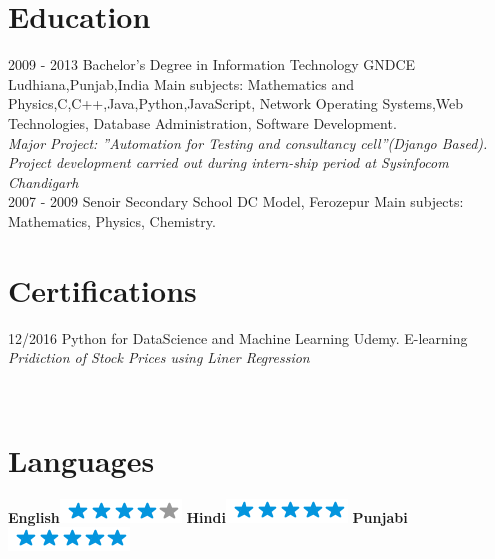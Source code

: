 \documentclass[]{friggeri-cv}
\begin{document}
\section{Education}
\begin{entrylist}
  \entry
    {2009 - 2013}
    {Bachelor's Degree in Information Technology}
    {GNDCE Ludhiana,Punjab,India}
    {Main subjects: Mathematics and Physics,C,C++,Java,Python,JavaScript, Network Operating Systems,Web Technologies, Database Administration, Software Development.\\
    \emph{Major Project: ”Automation for Testing and consultancy cell”(Django Based). Project development carried out during intern-ship period at Sysinfocom Chandigarh}\\}
  \entry
    {2007 - 2009}
    {Senoir Secondary School}
    {DC Model, Ferozepur}
    {Main subjects: Mathematics, Physics, Chemistry.}
\end{entrylist}

\section{Certifications}
\begin{entrylist}
  \entry
    {12/2016}
    {Python for DataScience and Machine Learning}
    {Udemy. E-learning}
    {\emph{Pridiction of Stock Prices using Liner Regression}}
    
\end{entrylist}

\newpage

\begin{aside}
~
~
~
   \section{Languages}
    \textbf{English}\includegraphics[scale=0.40]{img/4stars.png}
    \textbf{Hindi}\includegraphics[scale=0.40]{img/5stars.png}
    \textbf{Punjabi}\includegraphics[scale=0.40]{img/5stars.png}  
\end{aside}
\end{document}
